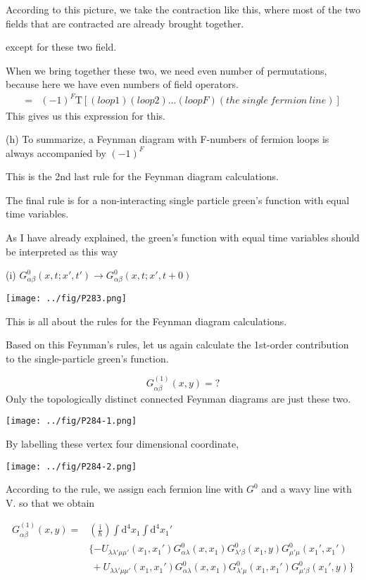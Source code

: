 According to this picture, we take the contraction like this, where most of the two fields that are contracted are already brought together.

except for these two field.

When we bring together these two, we need even number of permutations, because here we have even numbers of field operators.
\begin{align}
=&(-1)^F\mathrm{T}[(loop1)(loop2)...(loopF)(the\ single\ fermion\ line)]\nonumber
\end{align}
This gives us this expression for this.

(h) To summarize, a Feynman diagram with F-numbers of fermion loops is always accompanied by $(-1)^F$

This is the 2nd last rule for the Feynman diagram calculations.

The final rule is for a non-interacting single particle green's function with equal time variables.

As I have already explained, the green's function with equal time variables should be interpreted as this way

(i) $G_{\alpha\beta}^0(x,t;x',t')\rightarrow G_{\alpha\beta}^0(x,t;x',t+0)$

\begin{center}
\texttt{[image: ../fig/P283.png]}
\end{center}


This is all about the rules for the Feynman diagram calculations.

Based on this Feynman's rules, let us again calculate the 1st-order contribution to the single-particle green's function.

$$G_{\alpha\beta}^{(1)}(x,y)=?$$
Only the topologically distinct connected Feynman diagrams are just these two.
\begin{center}
\texttt{[image: ../fig/P284-1.png]}
\end{center}
By labelling these vertex four dimensional coordinate,
\begin{center}
\texttt{[image: ../fig/P284-2.png]}
\end{center}

According to the rule, we assign each fermion line with $G^0$ and a wavy line with V. so that we obtain

\begin{align}\label{2.5.4}
G_{\alpha\beta}^{(1)}(x,y)=&(\frac{\mathrm{i}}{\hbar})\int \mathrm{d}^4x_1\int \mathrm{d}^4x_1' \nonumber \\
&\{-U_{\lambda\lambda'\mu\mu'}(x_1,x_1')G_{\alpha\lambda}^0(x,x_1)G_{\lambda'\beta}^0(x_1,y)G_{\mu'\mu}^0(x_1',x_1') \nonumber \\
&\ +U_{\lambda\lambda'\mu\mu'}(x_1,x_1')G_{\alpha\lambda}^0(x,x_1)G_{\lambda'\mu}^0(x_1,x_1')G_{\mu'\beta}^0(x_1',y)\} 
\end{align}

